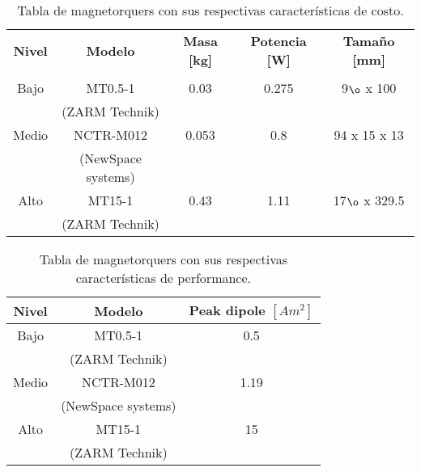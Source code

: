 \begin{table}[H]
	\centering
	\caption{Tabla de magnetorquers con sus respectivas características de costo.}
	\begin{tabular}{|c|c|c|c|c|}
		\hline
		\textbf{Nivel} & \textbf{Modelo} & \textbf{Masa [kg]} & \textbf{Potencia [W]} & \textbf{Tamaño [mm]}  \\
		& &  &  &   \\ \hline
		Bajo & MT0.5-1  & 0.03
		 & 0.275 & 9$\o$ x 100 \\
		& (ZARM Technik) &  &  &  \\ \hline
		Medio & NCTR-M012 & 0.053 & 0.8 &  94 x 15 x 13  \\
		& (NewSpace systems) & &  &  \\ \hline
		Alto & MT15-1  & 0.43 & 1.11
		 & 17$\o$ x 329.5  \\
		& (ZARM Technik) & &  &   \\ \hline
	\end{tabular}
	
\end{table}

\begin{table}[H]
	\centering
	\caption{Tabla de magnetorquers con sus respectivas características de performance.}
	\begin{tabular}{|c|c|c|}
		\hline
		\textbf{Nivel} & \textbf{Modelo} & \textbf{Peak dipole $[Am^2]$}  \\ \hline
		Bajo & MT0.5-1 & 0.5  \\
		& (ZARM Technik) &   \\ \hline
			Medio & NCTR-M012 & 1.19  \\
		& (NewSpace systems) &   \\ \hline
		Alto & MT15-1 & 15   \\
		& (ZARM Technik) &    \\ \hline
	\end{tabular}
	
\end{table}